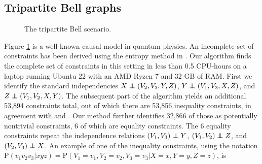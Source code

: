 \documentclass[12pt]{article}
\newcommand\indep{\protect\mathpalette{\protect\independenT}{\perp}}
\def\independenT#1#2{\mathrel{\rlap{$#1#2$}\mkern2mu{#1#2}}}
\def\Pr{{\mathrm{P}}}
\begin{document}
\subsection{Tripartite Bell graphs} \label{sec:tripart}

\begin{figure}[ht]
\begin{center}
\end{center}
\caption{The tripartite Bell scenario. \label{fig:tripart}}
\end{figure}

Figure \ref{fig:tripart} is a well-known causal model in quantum physics. An incomplete set of constraints has been derived using the entropy method in \citet{bell3}. Our algorithm finds the complete set of constraints in this setting in less than 0.5 CPU-hours on a laptop running Ubuntu 22 with an AMD Ryzen 7 and 32 GB of RAM. First we identify the standard independencies $X \indep (V_2, V_3, Y, Z)$, $Y \indep (V_1, V_3, X, Z)$, and $Z \indep (V_1, V_2, X, Y)$. The subsequent part of the algorithm yields an additional 53,894 constraints total, out of which there are 53,856 inequality constraints, in agreement with \citet{Sliwa2003Symmetries} and \citet{Pironio_2011}. Our method further identifies 32,866 of those as potentially nontrivial constraints, 6 of which are equality constraints. The 6 equality constraints repeat the independence relations $(V_1, V_3) \indep Y$, $(V_1, V_2) \indep Z$, and $(V_2, V_3) \indep X$. An example of one of the inequality constraints, using the notation $\Pr(v_1 v_2 v_3 | xyz) = \Pr(V_1 = v_1, V_2 = v_2, V_3 = v_3 | X = x, Y = y, Z = z)$, is
\end{document}

